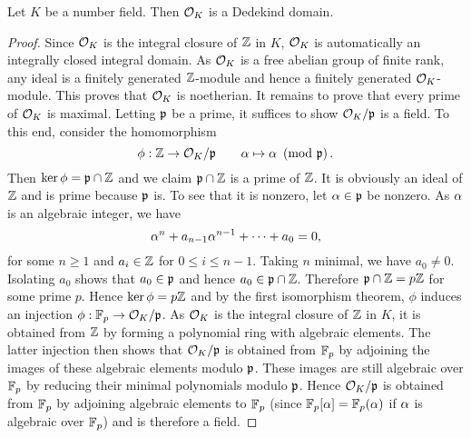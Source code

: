     \begin{theorem}\label{thm:ring_of_integers_is_Dedekind}
      Let $K$ be a number field. Then $\mathcal{O}_{K}$ is a Dedekind domain.
    \end{theorem}
    \begin{proof}
      Since $\mathcal{O}_{K}$ is the integral closure of $\mathbb{Z}$ in $K$, $\mathcal{O}_{K}$ is automatically an integrally closed integral domain. As $\mathcal{O}_{K}$ is a free abelian group of finite rank, any ideal is a finitely generated $\mathbb{Z}$-module and hence a finitely generated $\mathcal{O}_{K}$-module. This proves that $\mathcal{O}_{K}$ is noetherian. It remains to prove that every prime of $\mathcal{O}_{K}$ is maximal. Letting $\mathfrak{p}$ be a prime, it suffices to show $\mathcal{O}_{K}/\mathfrak{p}$ is a field. To this end, consider the homomorphism
      \[
        \phi:\mathbb{Z} \to \mathcal{O}_{K}/\mathfrak{p} \qquad \alpha \mapsto \alpha \ \left(\text{mod }\mathfrak{p}\right).
      \]
      Then $\ker\phi = \mathfrak{p} \cap \mathbb{Z}$ and we claim $\mathfrak{p} \cap \mathbb{Z}$ is a prime of $\mathbb{Z}$. It is obviously an ideal of $\mathbb{Z}$ and is prime because $\mathfrak{p}$ is. To see that it is nonzero, let $\alpha \in \mathfrak{p}$ be nonzero. As $\alpha$ is an algebraic integer, we have
      \[
        \alpha^{n}+a_{n-1}\alpha^{n-1}+\cdots+a_{0} = 0,
      \]
      for some $n \ge 1$ and $a_{i} \in \mathbb{Z}$ for $0 \le i \le n-1$. Taking $n$ minimal, we have $a_{0} \neq 0$. Isolating $a_{0}$ shows that $a_{0} \in \mathfrak{p}$ and hence $a_{0} \in \mathfrak{p} \cap \mathbb{Z}$. Therefore $\mathfrak{p} \cap \mathbb{Z} = p\mathbb{Z}$ for some prime $p$. Hence $\ker\phi = p\mathbb{Z}$ and by the first isomorphism theorem, $\phi$ induces an injection $\phi:\mathbb{F}_{p} \to \mathcal{O}_{K}/\mathfrak{p}$. As $\mathcal{O}_{K}$ is the integral closure of $\mathbb{Z}$ in $K$, it is obtained from $\mathbb{Z}$ by forming a polynomial ring with algebraic elements. The latter injection then shows that $\mathcal{O}_{K}/\mathfrak{p}$ is obtained from $\mathbb{F}_{p}$ by adjoining the images of these algebraic elements modulo $\mathfrak{p}$. These images are still algebraic over $\mathbb{F}_{p}$ by reducing their minimal polynomials modulo $\mathfrak{p}$. Hence $\mathcal{O}_{K}/\mathfrak{p}$ is obtained from $\mathbb{F}_{p}$ by adjoining algebraic elements to $\mathbb{F}_{p}$ (since $\mathbb{F}_{p}[\alpha] = \mathbb{F}_{p}(\alpha)$ if $\alpha$ is algebraic over $\mathbb{F}_{p}$) and is therefore a field.
    \end{proof}

